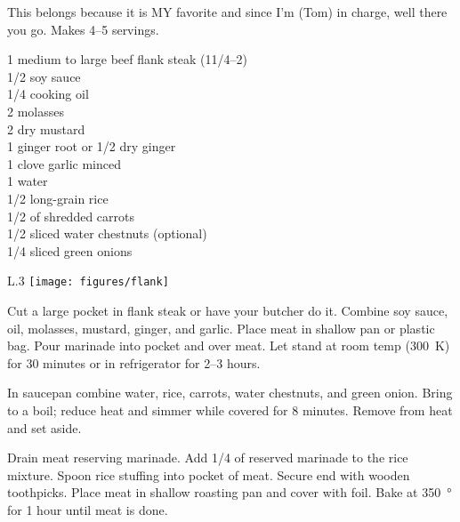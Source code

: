\begin{open}
  This belongs because it is MY favorite and since I'm (Tom) in charge,
  well there you go.  Makes \numrange{4}{5} servings.
\end{open}
\begin{ingredients}
  1 medium to large beef flank steak (1\SIrange{1/4}{2}{\pound}) \\
  \SI{1/2}{\cup} soy sauce                                    \\
  \SI{1/4}{\cup} cooking oil                                  \\
  \SI{2}{\tblspoon} molasses                                   \\
  \SI{2}{\teaspoon} dry mustard                               \\
  \SI{1}{\teaspoon} ginger root or \SI{1/2}{\teaspoon} dry ginger \\
  1 clove garlic minced                                       \\
  \SI{1}{\cup} water                                          \\
  \SI{1/2}{\cup} long-grain rice                              \\
  \SI{1/2}{\cup} of shredded carrots                          \\
  \SI{1/2}{\cup} sliced water chestnuts (optional)            \\
  \SI{1/4}{\cup} sliced green onions
\end{ingredients}
\begin{wrapfigure}{L}{.3\textwidth}
\centering\texttt{[image: figures/flank]}
\end{wrapfigure}
Cut a large pocket in flank steak or have your butcher do it.  Combine soy
sauce, oil, molasses, mustard, ginger, and garlic.  Place meat in shallow pan
or plastic bag.  Pour marinade into pocket and over meat. Let stand at room
temp (\SI{300}{\kelvin}) for 30 minutes or in refrigerator for
\numrange{2}{3} hours.

In saucepan combine water, rice, carrots, water chestnuts, and green onion.
Bring to a boil; reduce heat and simmer while covered for 8 minutes.  Remove
from heat and set aside.

Drain meat reserving marinade.  Add \SI{1/4}{\cup} of reserved marinade to the
rice mixture.  Spoon rice stuffing into pocket of meat.  Secure end with
wooden toothpicks.  Place meat in shallow roasting pan and cover with foil.
Bake at \SI{350}{\degree} for 1 hour until meat is done.

